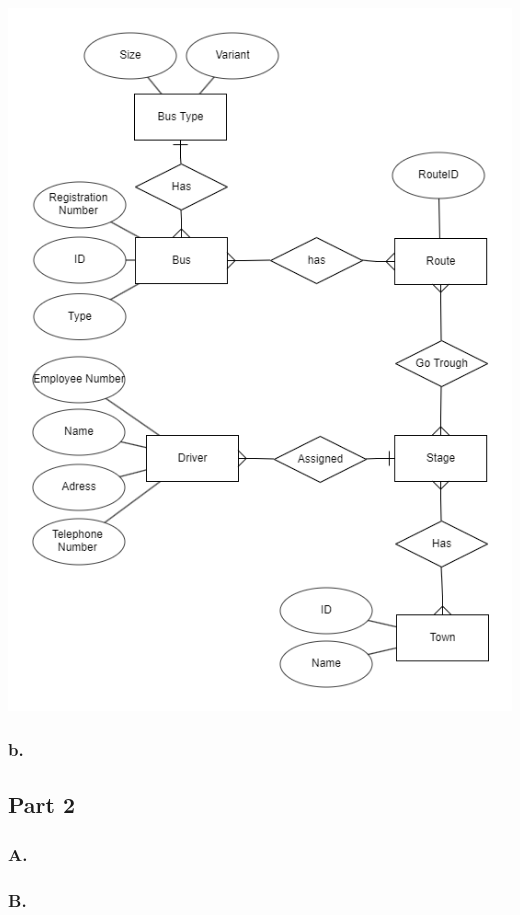 \documentclass[12pt,titlepage]{article}
\begin{document}
\includegraphics[width=14cm]{images/figures/fig1.png}

\subsubsection*{b.}

\subsection*{Part 2}

\subsubsection*{A.}

\subsubsection*{B.}
\end{document}
